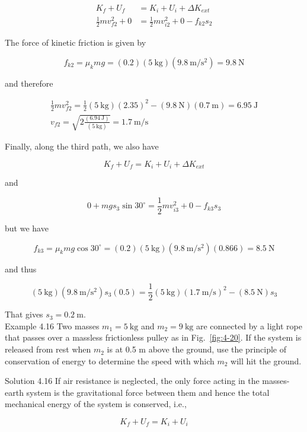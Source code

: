 \documentclass[10pt]{article}
\numberwithin{equation}{section}
\begin{document}
$$
\begin{aligned}
K_{f}+U_{f} & =K_{i}+U_{i}+\Delta K_{e x t} \\
\frac{1}{2} m v_{f 2}^{2}+0 & =\frac{1}{2} m v_{i 2}^{2}+0-f_{k 2} s_{2}
\end{aligned}
$$

The force of kinetic friction is given by

$$
f_{k 2}=\mu_{k} m g=(0.2)(5 \mathrm{~kg})\left(9.8 \mathrm{~m} / \mathrm{s}^{2}\right)=9.8 \mathrm{~N}
$$

and therefore

$$
\begin{gathered}
\frac{1}{2} m v_{f 2}^{2}=\frac{1}{2}(5 \mathrm{~kg})(2.35)^{2}-(9.8 \mathrm{~N})(0.7 \mathrm{~m})=6.95 \mathrm{~J} \\
v_{f 2}=\sqrt{2 \frac{(6.94 \mathrm{~J})}{(5 \mathrm{~kg})}}=1.7 \mathrm{~m} / \mathrm{s}
\end{gathered}
$$

Finally, along the third path, we also have

$$
K_{f}+U_{f}=K_{i}+U_{i}+\Delta K_{e x t}
$$

and

$$
0+m g s_{3} \sin 30^{\circ}=\frac{1}{2} m v_{i 3}^{2}+0-f_{k 3} s_{3}
$$

but we have

$$
f_{k 3}=\mu_{k} m g \cos 30^{\circ}=(0.2)(5 \mathrm{~kg})\left(9.8 \mathrm{~m} / \mathrm{s}^{2}\right)(0.866)=8.5 \mathrm{~N}
$$

and thus

$$
(5 \mathrm{~kg})\left(9.8 \mathrm{~m} / \mathrm{s}^{2}\right) s_{3}(0.5)=\frac{1}{2}(5 \mathrm{~kg})(1.7 \mathrm{~m} / \mathrm{s})^{2}-(8.5 \mathrm{~N}) s_{3}
$$

That gives $s_{3}=0.2 \mathrm{~m}$.\\
Example 4.16 Two masses $m_{1}=5 \mathrm{~kg}$ and $m_{2}=9 \mathrm{~kg}$ are connected by a light rope that passes over a massless frictionless pulley as in Fig.~\ref{fig:4-20}. If the system is released from rest when $m_{2}$ is at 0.5 m above the ground, use the principle of conservation of energy to determine the speed with which $m_{2}$ will hit the ground.

Solution 4.16 If air resistance is neglected, the only force acting in the masses-earth system is the gravitational force between them and hence the total mechanical energy of the system is conserved, i.e.,

$$
K_{f}+U_{f}=K_{i}+U_{i}
$$
\end{document}
